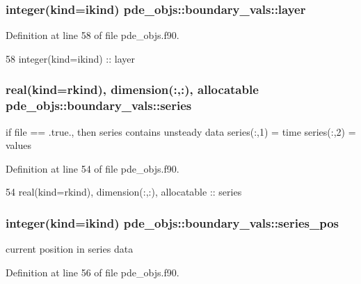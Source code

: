 \subsubsection[{layer}]{\setlength{\rightskip}{0pt plus 5cm}integer(kind=ikind) pde\+\_\+objs\+::boundary\+\_\+vals\+::layer}\label{structpde__objs_1_1boundary__vals_a9524ef168191b78d17c6345a44300627}


Definition at line 58 of file pde\+\_\+objs.\+f90.


\begin{DoxyCode}
58     \textcolor{keywordtype}{integer(kind=ikind)} :: layer
\end{DoxyCode}
\subsubsection[{series}]{\setlength{\rightskip}{0pt plus 5cm}real(kind=rkind), dimension(\+:,\+:), allocatable pde\+\_\+objs\+::boundary\+\_\+vals\+::series}\label{structpde__objs_1_1boundary__vals_ac9e3c7f87b16c30858358010c20af064}


if file == .true., then series contains unsteady data series(\+:,1) = time series(\+:,2) = values 



Definition at line 54 of file pde\+\_\+objs.\+f90.


\begin{DoxyCode}
54     \textcolor{keywordtype}{real(kind=rkind)}, \textcolor{keywordtype}{dimension(:,:)}, \textcolor{keywordtype}{allocatable} :: series
\end{DoxyCode}
\subsubsection[{series\+\_\+pos}]{\setlength{\rightskip}{0pt plus 5cm}integer(kind=ikind) pde\+\_\+objs\+::boundary\+\_\+vals\+::series\+\_\+pos}\label{structpde__objs_1_1boundary__vals_a3f8b49dc65efbfcf58a27069f2666c0e}


current position in series data 



Definition at line 56 of file pde\+\_\+objs.\+f90.



